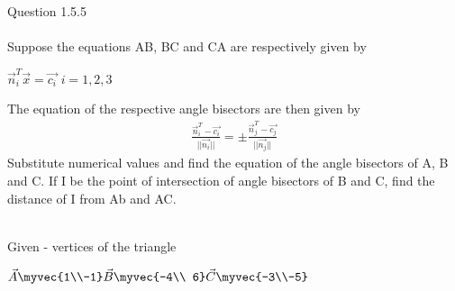 \documentclass[journal,12pt,twocolumn]{IEEEtran}
\theoremstyle{remark}
\begin{document}
Question 1.5.5 \\ \\Suppose the equations AB, BC and CA are respectively given by

$\vec{n}_{i}^{T}\vec{x} = \vec{c_{i}}  \,\,i=1 , 2 , 3$

The equation of the respective angle bisectors are then given by
\begin{align}
\frac{\vec{n}_{i}^{T} - \vec{c_{i}}}{||\vec{n_{i}}||} = \pm \frac{\vec{n}_{j}^{T} - \vec{c_{j}}}{||\vec{n_{j}}||}
\end{align}
Substitute numerical values and find the equation of the angle bisectors of A, B and C. If I be the point of intersection of angle bisectors of B and C, find the distance of I from Ab and AC.

\solution \\
Given - vertices of the triangle

$\vec{A} \myvec{1\\-1} \vec{B}\myvec{-4\\ 6} \vec{C}\myvec{-3\\-5}$
\end{document}
